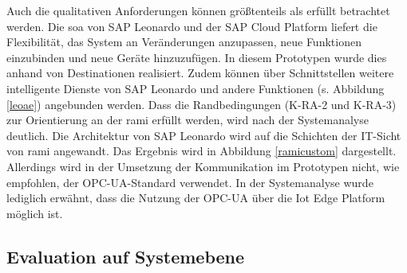 Auch die qualitativen Anforderungen können größtenteils als erfüllt betrachtet werden. Die \ac{soa} von SAP Leonardo und der SAP Cloud Platform liefert die Flexibilität, das System an Veränderungen anzupassen, neue Funktionen einzubinden und neue Geräte hinzuzufügen. In diesem Prototypen wurde dies anhand von Destinationen realisiert. Zudem können über Schnittstellen weitere intelligente Dienste von SAP Leonardo und andere Funktionen (s. Abbildung \ref{leoae}) angebunden werden. Dass die Randbedingungen (K-RA-2 und K-RA-3) zur Orientierung an der \ac{rami} erfüllt werden, wird nach der Systemanalyse deutlich. Die Architektur von SAP Leonardo wird auf die Schichten der IT-Sicht von \ac{rami} angewandt. Das Ergebnis wird in Abbildung \ref{ramicustom} dargestellt. Allerdings wird in der Umsetzung der Kommunikation im Prototypen nicht, wie empfohlen, der OPC-UA-Standard verwendet. In der Systemanalyse wurde lediglich erwähnt, dass die Nutzung der OPC-UA über die Iot Edge Platform möglich ist.

\subsection{Evaluation auf Systemebene}

